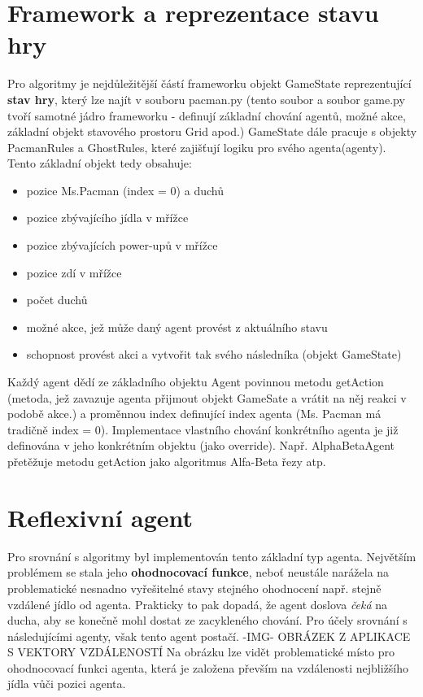 \section{Framework a reprezentace stavu hry}
Pro algoritmy je nejdůležitější částí frameworku objekt GameState reprezentující \textbf{stav hry}, který lze najít v souboru pacman.py (tento soubor a soubor game.py tvoří samotné jádro frameworku - definují základní chování agentů, možné akce, základní objekt stavového prostoru Grid apod.)
GameState dále pracuje s objekty PacmanRules a GhostRules, které zajišťují logiku pro svého agenta(agenty).
Tento základní objekt tedy obsahuje:
\begin{itemize}
\item pozice Ms.Pacman (index = 0) a duchů
\item pozice zbývajícího jídla v mřížce
\item pozice zbývajících power-upů v mřížce
\item pozice zdí v mřížce
\item počet duchů
\item možné akce, jež může daný agent provést z aktuálního stavu
\item schopnost provést akci a vytvořit tak svého následníka (objekt GameState)
\end{itemize}
Každý agent dědí ze základního objektu Agent povinnou metodu getAction (metoda, jež zavazuje agenta přijmout objekt GameSate a vrátit na něj reakci v podobě akce.) a proměnnou index definující index agenta (Ms. Pacman má tradičně index = 0).
Implementace vlastního chování konkrétního agenta je již definována v jeho konkrétním objektu (jako override). Např. AlphaBetaAgent přetěžuje metodu getAction jako algoritmus Alfa-Beta řezy atp.

\section{Reflexivní agent}
Pro srovnání s algoritmy byl implementován tento základní typ agenta. Největším problémem se stala jeho \textbf{ohodnocovací funkce}, neboť neustále narážela na problematické nesnadno vyřešitelné stavy stejného ohodnocení např. stejně vzdálené jídlo od agenta. Prakticky to pak dopadá, že agent doslova \textit{čeká} na ducha, aby se konečně mohl dostat ze zacykleného chování. Pro účely srovnání s následujícími agenty, však tento agent postačí.
-IMG- OBRÁZEK Z APLIKACE S VEKTORY VZDÁLENOSTÍ Na obrázku lze vidět problematické místo pro ohodnocovací funkci agenta, která je založena převším na vzdálenosti nejbližšího jídla vůči pozici agenta.


